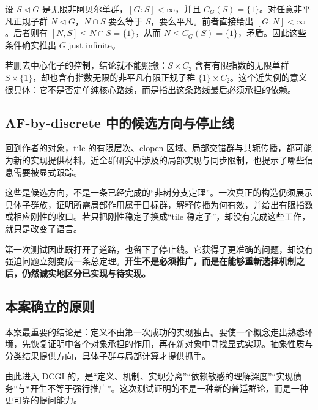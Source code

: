 \documentclass[UTF8,zihao=-4,fontset=none,oneside,openany]{ctexbook}
\begin{document}
设 $S\triangleleft G$ 是无限非阿贝尔单群，$[G:S]<\infty$，并且 $C_G(S)=\{1\}$。对任意非平凡正规子群 $N\triangleleft G$，$N\cap S$ 要么等于 $S$，要么平凡。前者直接给出 $[G:N]<\infty$。后者则有 $[N,S]\leq N\cap S=\{1\}$，从而 $N\leq C_G(S)=\{1\}$，矛盾。因此这些条件确实推出 $G$ just infinite。

若删去中心化子的控制，结论就不能照搬：$S\times C_2$ 含有有限指数的无限单群 $S\times\{1\}$，却也含有指数无限的非平凡有限正规子群 $\{1\}\times C_2$。这个近失例的意义很具体：它不是否定单纯核心路线，而是指出这条路线最后必须承担的依赖。

\subsection*{AF-by-discrete 中的候选方向与停止线}
回到作者的对象，tile 的有限层次、clopen 区域、局部交错群与共轭传播，都可能为新的实现提供材料。近全群研究中涉及的局部实现与同步限制，也提示了哪些信息需要被显式跟踪。

这些是候选方向，不是一条已经完成的“非树分支定理”。一次真正的构造仍须展示具体子群族，证明所需局部作用属于目标群，解释传播为何有效，并给出有限指数或相应刚性的收口。若只把刚性稳定子换成“tile 稳定子”，却没有完成这些工作，就只是改变了语言。

第一次测试因此既打开了道路，也留下了停止线。它获得了更准确的问题，却没有强迫问题立刻变成一条总定理。\textbf{开生不是必须推广，而是在能够重新选择机制之后，仍然诚实地区分已实现与待实现。}

\subsection*{本案确立的原则}
本案最重要的结论是：定义不由第一次成功的实现独占。要使一个概念走出熟悉环境，先恢复证明中各个对象承担的作用，再在新对象中寻找显式实现。抽象性质与分类结果提供方向，具体子群与局部计算才提供抓手。

由此进入 DCGI 的，是“定义、机制、实现分离”“依赖敏感的理解深度”“实现债务”与“开生不等于强行推广”。这次测试证明的不是一种新的普适群论，而是一种更可靠的提问能力。
\end{document}
